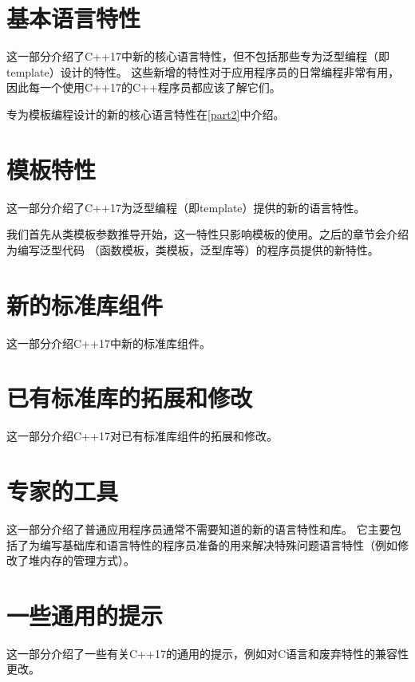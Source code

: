 \documentclass[twoside,10pt,AutoFakeBold,AutoFakeSlant]{book}
\begin{document}
    \frontmatter
    \pagestyle{front}
    \tableofcontents

    \mainmatter
    \pagestyle{main}

    \part{基本语言特性}\label{part1}
    这一部分介绍了C++17中新的核心语言特性，但不包括那些专为泛型编程（即template）设计的特性。
    这些新增的特性对于应用程序员的日常编程非常有用，因此每一个使用C++17的C++程序员都应该了解它们。

    专为模板编程设计的新的核心语言特性在\autoref{part2}中介绍。

    
    
    
    
    
    
    
    


    \part{模板特性}\label{part2}
    这一部分介绍了C++17为泛型编程（即template）提供的新的语言特性。

    我们首先从类模板参数推导开始，这一特性只影响模板的使用。之后的章节会介绍为编写泛型代码
    （函数模板，类模板，泛型库等）的程序员提供的新特性。

    
    
    
    
    
    


    \part{新的标准库组件}\label{part3}
    这一部分介绍C++17中新的标准库组件。

    
    
    
    
    
    


    \part{已有标准库的拓展和修改}\label{part4}
    这一部分介绍C++17对已有标准库组件的拓展和修改。

    
    
    
    
    
    
    
    


    \part{专家的工具}\label{part5}
    这一部分介绍了普通应用程序员通常不需要知道的新的语言特性和库。
    它主要包括了为编写基础库和语言特性的程序员准备的用来解决特殊问题语言特性（例如修改了堆内存的管理方式）。

    
    
    
    
    


    \part{一些通用的提示}\label{part6}
    这一部分介绍了一些有关C++17的通用的提示，例如对C语言和废弃特性的兼容性更改。
    
    

    \backmatter
\end{document}
